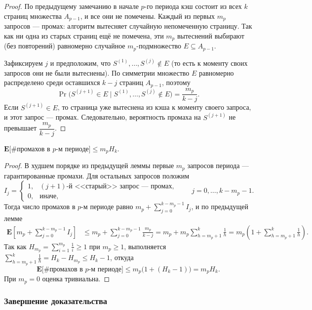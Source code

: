 \begin{proof}
	По предыдущему замечанию в начале $p$-го периода кэш состоит из всех $k$ страниц множества $A_{p-1}$, и все они не помечены. Каждый из первых $m_p$ запросов --- промах: алгоритм вытесняет случайную непомеченную страницу. Так как ни одна из старых страниц ещё не помечена, эти $m_p$ вытеснений выбирают (без повторений) равномерно случайное $m_p$-подмножество $E \subseteq A_{p-1}$.
	
	Зафиксируем $j$ и предположим, что $S^{(1)},\ldots,S^{(j)} \notin E$ (то есть к моменту своих запросов они не были вытеснены). По симметрии множество $E$ равномерно распределено среди оставшихся $k-j$ страниц $A_{p-1}$, поэтому
	\[
	\Pr\bigl(S^{(j+1)} \in E \mid S^{(1)},\ldots,S^{(j)} \notin E\bigr) = \frac{m_p}{k-j}.
	\]
	Если $S^{(j+1)} \in E$, то страница уже вытеснена из кэша к моменту своего запроса, и этот запрос --- промах. Следовательно, вероятность промаха на $S^{(j+1)}$ не превышает $\dfrac{m_p}{k-j}$.
\end{proof}

\begin{Lemma}{}{}
	$\mathbf{E}\bigl[\#\text{промахов в }p\text{-м периоде}\bigr] \leq m_p H_k$.
\end{Lemma}

\begin{proof}
	В худшем порядке из предыдущей леммы первые $m_p$ запросов периода --- гарантированные промахи. Для остальных запросов положим
	\[
	I_j =
	\begin{cases}
		1, & (j{+}1)\text{-й <<старый>> запрос --- промах},\\
		0, & \text{иначе},
	\end{cases}
	\qquad j = 0,\ldots,k-m_p-1.
	\]
	Тогда число промахов в $p$-м периоде равно $m_p + \sum_{j=0}^{k-m_p-1} I_j$, и по предыдущей лемме
	\begin{align*}
		\mathbf{E}\!\left[m_p + \sum_{j=0}^{k-m_p-1} I_j\right]
		&\leq m_p + \sum_{j=0}^{k-m_p-1} \frac{m_p}{k-j}
		= m_p + m_p \sum_{h=m_p+1}^{k} \frac{1}{h}
		= m_p\left(1 + \sum_{h=m_p+1}^{k} \frac{1}{h}\right).
	\end{align*}
	Так как $H_{m_p} = \sum_{i=1}^{m_p} \tfrac{1}{i} \geq 1$ при $m_p \geq 1$, выполняется $\sum_{h=m_p+1}^{k} \tfrac{1}{h} = H_k - H_{m_p} \leq H_k - 1$, откуда
	\[
	\mathbf{E}\bigl[\#\text{промахов в }p\text{-м периоде}\bigr] \leq m_p\bigl(1 + (H_k - 1)\bigr) = m_p H_k.
	\]
	При $m_p = 0$ оценка тривиальна.
\end{proof}

\subsubsection*{Завершение доказательства}

